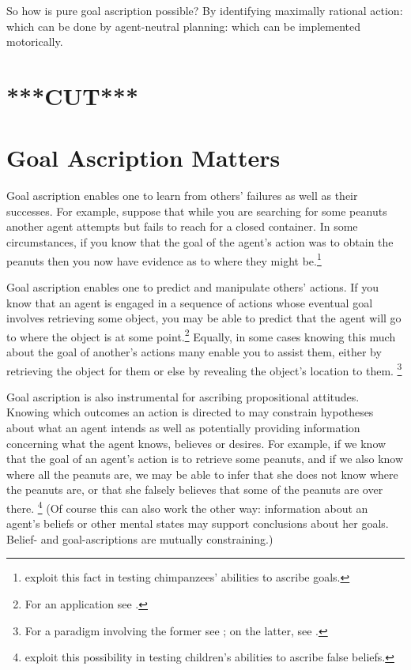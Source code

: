 \documentclass[12pt,\papersize]{extarticle}
\begin{document}
So how is pure goal ascription possible?
By identifying maximally rational action:
	which can be done by agent-neutral planning:
	which can be implemented motorically.



\section{***CUT***}
\section{Goal Ascription Matters}
Goal ascription enables one to learn from others' failures as well as their successes.
For example, suppose that while you are searching for some peanuts 
another agent attempts but fails to reach for a closed container.
In some circumstances,
if you know that the goal of the agent's action was to obtain the peanuts
then you now have evidence as to where they might be.\footnote{
\citet{hare_chimpanzees_2004} exploit this fact in testing chimpanzees' abilities to ascribe goals.
}


Goal ascription enables one
to predict and manipulate others' actions.
If you know that an agent is engaged in a sequence of actions whose eventual goal involves retrieving some object,
you may be able to predict that the agent will go to where the object is at some point.\footnote{
For an application see \citet{Hare:2001ph}.
}
Equally, in some cases knowing this much about the goal of another's actions many enable you to assist them,
either 
by retrieving the object for them 
or else
by revealing the object's location to them.%
\footnote{
For a paradigm involving the former see \citet{warneken:2007sa};
on the latter, see \citet{Liszkowski:2008al}.
}

Goal ascription is also instrumental for ascribing propositional attitudes.
Knowing which outcomes an action is directed to may constrain hypotheses about what an agent intends 
as well as
potentially providing information concerning what the agent knows, believes or desires.
For example,
if we know that the goal of an agent's action is to retrieve some peanuts,
and if we also know where all the peanuts are,
we may be able to infer that she does not know where the peanuts are,
or that she falsely believes that some of the peanuts are over there.%
\footnote{
\citet{Wimmer:1998kx} exploit this possibility in testing children's abilities to ascribe false beliefs.
}
(Of course this can also work the other way:
information about an agent's beliefs or other mental states may support conclusions about her goals.
Belief- and goal-ascriptions are mutually constraining.)




\small

\end{document}
